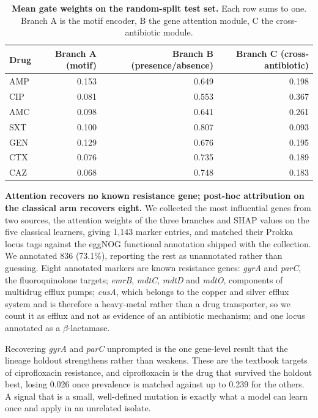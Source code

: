 \begin{table}[t]\centering\small
\caption{\textbf{Mean gate weights on the random-split test set.} Each row sums to one. Branch A is
the motif encoder, B the gene attention module, C the cross-antibiotic module.}
\label{tab:gate}
\begin{tabular}{lrrr}
\toprule
Drug & Branch A (motif) & Branch B (presence/absence) & Branch C (cross-antibiotic) \\
\midrule
AMP & 0.153 & 0.649 & 0.198 \\
CIP & 0.081 & 0.553 & 0.367 \\
AMC & 0.098 & 0.641 & 0.261 \\
SXT & 0.100 & 0.807 & 0.093 \\
GEN & 0.129 & 0.676 & 0.195 \\
CTX & 0.076 & 0.735 & 0.189 \\
CAZ & 0.068 & 0.748 & 0.183 \\
\bottomrule
\end{tabular}
\end{table}

\textbf{Attention recovers no known resistance gene; post-hoc attribution on the classical arm
recovers eight.} We collected the most influential genes from two sources, the attention weights of
the three branches and SHAP values \cite{lundberg2017shap} on the five classical learners, giving
1,143 marker entries, and matched their Prokka \cite{seemann2014prokka} locus tags against the
eggNOG \cite{huertacepas2019eggnog} functional annotation shipped with the collection. We annotated
836 (73.1\%), reporting the rest as unannotated rather than guessing. Eight annotated markers are
known resistance genes: \textit{gyrA} and \textit{parC}, the fluoroquinolone targets;
\textit{emrB}, \textit{mdtC}, \textit{mdtD} and \textit{mdtO}, components of multidrug efflux
pumps; \textit{cusA}, which belongs to the copper and silver efflux system and is therefore a
heavy-metal rather than a drug transporter, so we count it as efflux and not as evidence of an
antibiotic mechanism; and one locus annotated as a $\beta$-lactamase.

Recovering \textit{gyrA} and \textit{parC} unprompted is the one gene-level result that the lineage
holdout strengthens rather than weakens. These are the textbook targets of ciprofloxacin
resistance, and ciprofloxacin is the drug that survived the holdout best, losing 0.026 once
prevalence is matched against up to 0.239 for the others. A signal that is a small, well-defined
mutation is exactly what a model can learn once and apply in an unrelated isolate.

